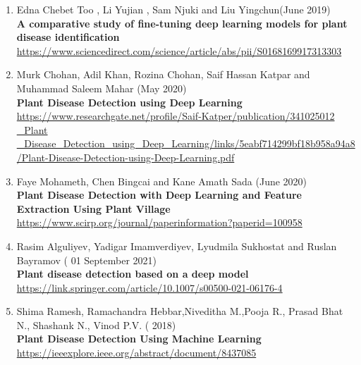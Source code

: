 \begin{enumerate}
    \item Edna Chebet Too , Li Yujian , Sam Njuki and Liu Yingchun(June 2019) \\
        \textbf{A comparative study of fine-tuning deep learning models for plant disease identification} \\
        \href{https://www.sciencedirect.com/science/article/abs/pii/S0168169917313303}{https://www.sciencedirect.com/science/article/abs/pii/S0168169917313303} \\

    \item Murk Chohan, Adil Khan, Rozina Chohan, Saif Hassan Katpar and Muhammad Saleem Mahar (May 2020) \\
        \textbf{Plant Disease Detection using Deep Learning} \\
        \href{https://www.researchgate.net/profile/Saif-Katper/publication/341025012_Plant_Disease_Detection_using_Deep_Learning/links/5eabf714299bf18b958a94a8/Plant-Disease-Detection-using-Deep-Learning.pdf}
        {https://www.researchgate.net/profile/Saif-Katper/publication/341025012 \_Plant \_Disease\_Detection\_using\_Deep\_Learning/links/5eabf714299bf18b958a94a8/Plant-Disease-Detection-using-Deep-Learning.pdf} \\

    \item Faye Mohameth, Chen Bingcai and Kane Amath Sada (June 2020) \\
        \textbf{Plant Disease Detection with Deep Learning and Feature Extraction Using Plant Village} \\
        \href{https://www.scirp.org/journal/paperinformation?paperid=100958}{https://www.scirp.org/journal/paperinformation?paperid=100958} \\

    \item Rasim Alguliyev, Yadigar Imamverdiyev, Lyudmila Sukhostat and Ruslan Bayramov  ( 01 September 2021) \\
        \textbf{Plant disease detection based on a deep model} \\
        \href{https://link.springer.com/article/10.1007/s00500-021-06176-4}{https://link.springer.com/article/10.1007/s00500-021-06176-4} \\

    \item Shima Ramesh, Ramachandra Hebbar,Niveditha M.,Pooja R., Prasad Bhat N., Shashank N., Vinod P.V. ( 2018) \\
        \textbf{Plant Disease Detection Using Machine Learning} \\
        \href{https://ieeexplore.ieee.org/abstract/document/8437085}{https://ieeexplore.ieee.org/abstract/document/8437085} \\


\end{enumerate}
